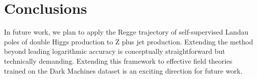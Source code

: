 \section{Conclusions}\label{sec:conclusions}

In future work, we plan to apply the Regge trajectory of self-supervised
Landau poles of double Higgs production to Z plus jet production.
Extending the method beyond leading logarithmic accuracy is conceptually
straightforward but technically demanding. Extending this framework to
effective field theories trained on the Dark Machines dataset is an
exciting direction for future work.

